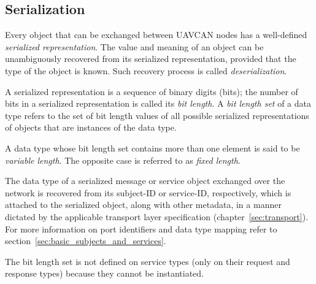 \subsection{Serialization}

Every object that can be exchanged between UAVCAN nodes has a well-defined \emph{serialized representation}.
The value and meaning of an object can be unambiguously recovered from its serialized representation,
provided that the type of the object is known.
Such recovery process is called \emph{deserialization}.

\label{sec:dsdl_bit_length_set}
A serialized representation is a sequence of binary digits (bits);
the number of bits in a serialized representation is called its \emph{bit length}.
A \emph{bit length set} of a data type refers to the set of bit length values of all possible
serialized representations of objects that are instances of the data type.

A data type whose bit length set contains more than one element is said to be \emph{variable length}.
The opposite case is referred to as \emph{fixed length}.

The data type of a serialized message or service object exchanged over the network
is recovered from its subject-ID or service-ID, respectively,
which is attached to the serialized object, along with other metadata, in a manner dictated by the applicable
transport layer specification (chapter~\ref{sec:transport}).
For more information on port identifiers and data type mapping refer to section~\ref{sec:basic_subjects_and_services}.

The bit length set is not defined on service types (only on their request and response types)
because they cannot be instantiated.
